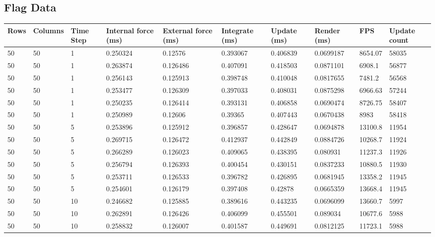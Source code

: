 \begin{landscape}
\subsection{Flag Data}

\begin{longtable}{ | l | l | l | l | l | l | l | l | l | l | }
\hline
 Rows &  Columns &  Time Step &  Internal force (ms) &  External force (ms) &  Integrate (ms) &  Update (ms) &  Render (ms) &  FPS &  Update count \\ \hline
50 & 50 & 1 & 0.250324 & 0.12576 & 0.393067 & 0.406839 & 0.0699187 & 8654.07 & 58035\\ \hline
50 & 50 & 1 & 0.263874 & 0.126486 & 0.407091 & 0.418503 & 0.0871101 & 6908.1 & 56877\\ \hline
50 & 50 & 1 & 0.256143 & 0.125913 & 0.398748 & 0.410048 & 0.0817655 & 7481.2 & 56568\\ \hline
50 & 50 & 1 & 0.253477 & 0.126309 & 0.397033 & 0.408031 & 0.0875298 & 6966.63 & 57244\\ \hline
50 & 50 & 1 & 0.250235 & 0.126414 & 0.393131 & 0.406858 & 0.0690474 & 8726.75 & 58407\\ \hline
50 & 50 & 1 & 0.250989 & 0.12606 & 0.39365 & 0.407443 & 0.0670438 & 8983 & 58418\\ \hline
50 & 50 & 5 & 0.253896 & 0.125912 & 0.396857 & 0.428647 & 0.0694878 & 13100.8 & 11954\\ \hline
50 & 50 & 5 & 0.269715 & 0.126472 & 0.412937 & 0.442849 & 0.0884726 & 10268.7 & 11924\\ \hline
50 & 50 & 5 & 0.266289 & 0.126023 & 0.409065 & 0.438395 & 0.080931 & 11237.3 & 11926\\ \hline
50 & 50 & 5 & 0.256794 & 0.126393 & 0.400454 & 0.430151 & 0.0837233 & 10880.5 & 11930\\ \hline
50 & 50 & 5 & 0.253711 & 0.126533 & 0.396782 & 0.426895 & 0.0681945 & 13358.2 & 11945\\ \hline
50 & 50 & 5 & 0.254601 & 0.126179 & 0.397408 & 0.42878 & 0.0665359 & 13668.4 & 11945\\ \hline
50 & 50 & 10 & 0.246682 & 0.125885 & 0.389616 & 0.443235 & 0.0696099 & 13660.7 & 5997\\ \hline
50 & 50 & 10 & 0.262891 & 0.126426 & 0.406099 & 0.455501 & 0.089034 & 10677.6 & 5988\\ \hline
50 & 50 & 10 & 0.258832 & 0.126007 & 0.401587 & 0.449691 & 0.0812125 & 11723.1 & 5988\\ \hline

\end{longtable}
\end{landscape}
